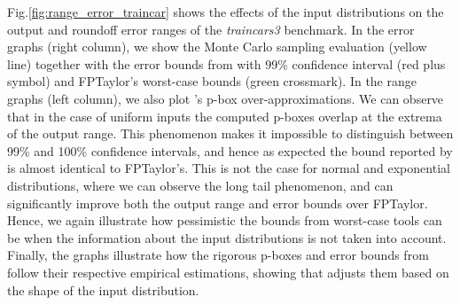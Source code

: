 Fig.\ref{fig:range_error_traincar} shows the effects of the input distributions
on the output and roundoff error ranges of the \emph{traincars3} benchmark.
%
In the error graphs (right column), we show the Monte Carlo sampling evaluation
(yellow line) together with the error bounds from \Tool with 99\% confidence
interval (red plus symbol) and FPTaylor's worst-case bounds (green crossmark). 
%
In the range graphs (left column), we also plot \Tool's p-box
over-approximations.
%
We can observe that in the case of uniform inputs the computed p-boxes overlap
at the extrema of the output range.
%
This phenomenon makes it impossible to distinguish between 99\% and 100\%
confidence intervals, and hence as expected the bound reported by \Tool is
almost identical to FPTaylor's.
%
This is not the case for normal and exponential distributions, where we can
observe the long tail phenomenon, and \Tool can significantly improve both the
output range and error bounds over FPTaylor.
%
%
Hence, we again illustrate how pessimistic the bounds from worst-case tools can be when the information about the input distributions
is not taken into account.
%
%
Finally, the graphs illustrate how the rigorous p-boxes and error bounds from
\Tool follow their respective empirical estimations, showing that \Tool adjusts
them based on the shape of the input distribution.

